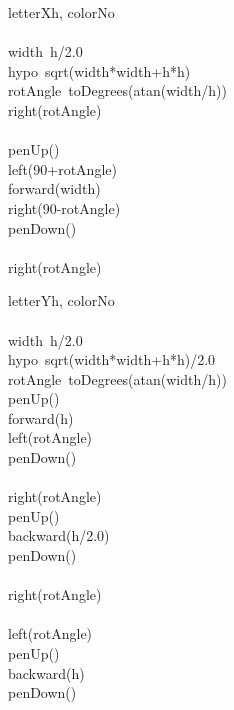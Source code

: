 \documentclass[a4paper,10pt]{article}
\begin{document}
\begin{pseudocode}{letterX}{h, colorNo }
\label{letterX}
\\
\\
  width\gets\ h/2.0\\
  hypo\gets\ sqrt(width*width+h*h)\\
  rotAngle\gets\ toDegrees(atan(width/h))\\
  right(rotAngle)\\
  \\
  penUp()\\
  left(90+rotAngle)\\
  forward(width)\\
  right(90-rotAngle)\\
  penDown()\\
  \\
  right(rotAngle)\\
\ENDPROCEDURE
\end{pseudocode}


\begin{pseudocode}{letterY}{h, colorNo }
\label{letterY}
\\
\\
  width\gets\ h/2.0\\
  hypo\gets\ sqrt(width*width+h*h)/2.0\\
  rotAngle\gets\ toDegrees(atan(width/h))\\
  penUp()\\
  forward(h)\\
  left(rotAngle)\\
  penDown()\\
  \\
  right(rotAngle)\\
  penUp()\\
  backward(h/2.0)\\
  penDown()\\
  \\
  right(rotAngle)\\
  \\
  left(rotAngle)\\
  penUp()\\
  backward(h)\\
  penDown()\\
\ENDPROCEDURE
\end{pseudocode}
\end{document}
